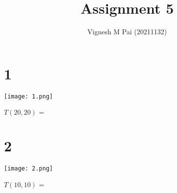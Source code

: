 \documentclass{article}
\title{Assignment 5}
\author{Vignesh M Pai (20211132)}
\date{}
\begin{document}
\maketitle

\section*{1}

\begin{center}
    \texttt{[image: 1.png]}
\end{center}

$T(20, 20)$ = 

\section*{2}

\begin{center}
    \texttt{[image: 2.png]}
\end{center}

$T(10, 10)$ = 
\end{document}
